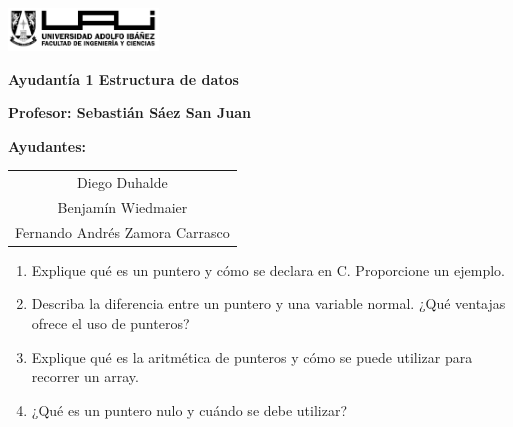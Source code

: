 \documentclass[12pt]{article}
\begin{document}
    \begin{titlepage}
        \centering
        \includegraphics[width=0.3\textwidth]{../imgs/logo-uai-fic.png}
        
        \vspace{0.5cm}
        \textbf{\fontsize{12}{24} Ayudantía 1 Estructura de datos}
        
        \vspace{0.5cm}
        \textbf{\fontsize{12}{24}\selectfont Profesor: Sebastián Sáez San Juan}
        
        \begin{center}
            \textbf{\fontsize{12}{24}\selectfont Ayudantes:}
        \end{center}
        \vspace{-0.8cm}
        \begin{center}
            \renewcommand{\arraystretch}{1.5}
            \begin{tabular}{c}
                Diego Duhalde \\ 
                Benjamín Wiedmaier \\ 
                Fernando Andrés Zamora Carrasco
            \end{tabular}
        \end{center}
        \vspace{0cm}

        \begin{enumerate}
            \item Explique qué es un puntero y cómo se declara en C. Proporcione un ejemplo.
            \item Describa la diferencia entre un puntero y una variable normal. 
            ¿Qué ventajas ofrece el uso de punteros?
            \item Explique qué es la aritmética de punteros y cómo se puede utilizar para recorrer un array.
            \item ¿Qué es un puntero nulo y cuándo se debe utilizar?


\end{enumerate}
\end{titlepage}
\end{document}
